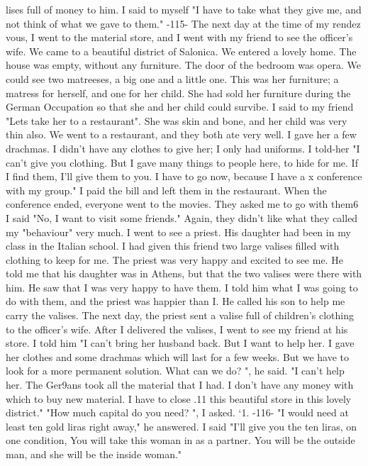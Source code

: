 lises full of money to him.
I said to myself "I have to take what they give me, and 
not think of what we gave to them."
-115- 
The next day at the time of my rendez vous, I went to the material store, and I 
went with my friend to see the officer's wife.
We came to a beautiful district of 
Salonica.
We entered a lovely home.
The house was empty, without any furniture.
The 
door of the bedroom was opera.
We could see two matreeses, a big one and a little one.
This was her furniture; a matress for herself, and one for her child.
She had sold 
her furniture during the German Occupation so that she and her child could survibe.
I said to my friend "Lets take her to a restaurant".
She was skin and bone, and 
her child was very thin also.
We went to a restaurant, and they both ate very well.
I gave her a few drachmas.
I didn't have any clothes to give her; I only had uniforms.
I told-her "I can't give you clothing.
But I gave many things to people here, to hide 
for me.
If I find them, I'll give them to you.
I have to go now, because I have a 
x conference with my group."
I paid the bill and left them in the restaurant.
When the conference ended, everyone went to the movies.
They asked me to go with 
them6 I said "No, I want to visit some friends."
Again, they didn't like what they 
called my "behaviour" very much.
I went to see a priest.
His daughter had been in my class in the Italian school.
I had given this friend two large valises filled with clothing to keep for me.
The 
priest was very happy and excited to see me.
He told me that his daughter was in 
Athens, but that the two valises were there with him.
He saw that I was very happy to 
have them.
I told him what I was going to do with them, and the priest was happier 
than I. He called his son to help me carry the valises.
The next day, the priest sent 
a valise full of children's clothing to the officer's wife.
After I delivered the valises, I went to see my friend at his store.
I told him 
"I can't bring her husband back.
But I want to help her.
I gave her clothes and some 
drachmas which will last for a few weeks.
But we have to look for a more permanent 
solution.
What can we do?
", he said.
"I can't help her.
The Ger9ans took all the material 
that I had.
I don't have any money with which to buy new material.
I have to close 
.11 
this beautiful store in this lovely district."
"How much capital do you need?
", I asked.
`1.
-116- 
"I would need at least ten gold liras right away," he answered.
I said "I'll 
give you the ten liras, on one condition, You will take this woman in as a partner.
You will be the outside man, and she will be the inside woman."
